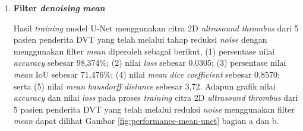 \begin{enumerate}
	
	\item \textbf{Filter \textit{denoising} \textit{mean}} 
	
	Hasil \textit{training} model U-Net menggunakan citra 2D \textit{ultrasound} \textit{thrombus} dari 5 pasien penderita DVT yang telah melalui tahap reduksi \textit{noise} dengan menggunakan filter \textit{mean} diperoleh sebagai berikut, (1) persentase nilai \textit{accuracy} sebesar 98,374\%; (2) nilai \textit{loss} sebesar 0,0305; (3) persentase nilai \textit{mean} IoU sebesar 71,476\%; (4) nilai \textit{mean} \textit{dice coefficient} sebesar 0,8570; serta (5) nilai \textit{mean} \textit{hausdorff distance} sebesar 3,72. Adapun grafik nilai \textit{accuracy} dan nilai \textit{loss} pada proses \textit{training} citra 2D \textit{ultrasound} \textit{thrombus} dari 5 pasien penderita DVT yang telah melalui reduksi \textit{noise} menggunakan filter \textit{mean} dapat dilihat Gambar \ref{fig:performance-mean-unet} bagian a dan b.
	

\end{enumerate}
